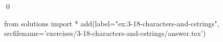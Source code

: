 
\begin{ex}
  \label{ex:3-18-characters-and-cstrings}
  
  \qed
\end{ex}
\begin{python0}
from solutions import *
add(label="ex:3-18-characters-and-cstrings",
    srcfilename='exercises/3-18-characters-and-cstrings/answer.tex')
\end{python0}
